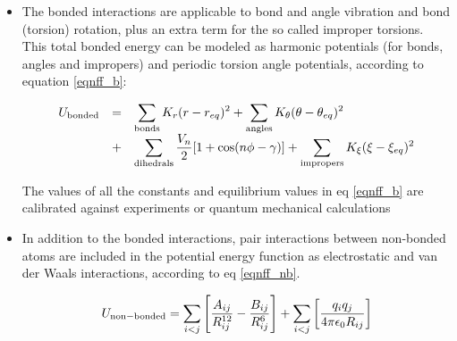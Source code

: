 \documentclass[a4paper,12pt]{article}
\begin{document}
\begin{itemize}
\item The bonded interactions are applicable to bond and angle vibration and bond (torsion) rotation, plus an extra term for the so called improper torsions. This total bonded energy can be modeled as harmonic potentials (for bonds, angles and impropers) and periodic torsion angle potentials, according to equation \ref {eqnff_b}:


\begin{equation}
\begin{array}{lll}
 U_{\rm bonded} &=&\displaystyle \sum_{\rm bonds} K_r (r - r_{eq})^2
                     + \sum_{\rm angles} K_\theta (\theta - \theta_{eq})^2 \\
                     &+&\displaystyle \sum_{\rm dihedrals} { \frac{V_n}{2} }
                                       [1 + {\rm cos}(n\phi - \gamma)]
                     + \sum_{\rm impropers} K_\xi (\xi - \xi_{eq})^2 
\end{array}
\label {eqnff_b}
\end{equation}

The values of all the constants and equilibrium values in eq \ref {eqnff_b} are calibrated against experiments or quantum mechanical calculations %
\item In addition to the bonded interactions, pair interactions between non-bonded atoms are included in the potential energy function as electrostatic and van der Waals interactions, according to eq \ref {eqnff_nb}.

\begin{equation}
U_{\rm non-bonded} =  \sum_{i<j} \left [ \frac{A_{ij} }{R_{ij}^{12}} -
                                          \frac{B_{ij}}{R_{ij}^6}
                                 \right ]
                     + \sum_{i<j} \left [
                                          \frac{q_iq_j}{4 \pi \epsilon _{0} R_{ij}}
                                   \right ]
\label{eqnff_nb}
\end{equation}


\end{itemize}
\end{document}
